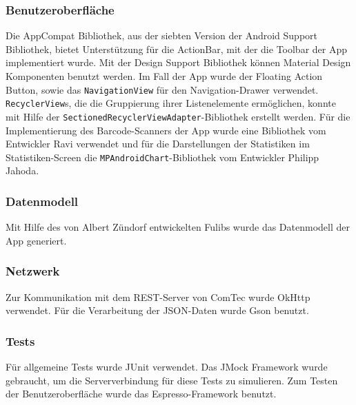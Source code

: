\subsubsection{Benutzeroberfläche} \label{subsubsec:ui-libraries}
Die AppCompat Bibliothek, aus der siebten Version der Android Support Bibliothek, bietet Unterstützung für die ActionBar, mit der die Toolbar der App implementiert wurde.
Mit der Design Support Bibliothek können Material Design Komponenten benutzt werden.
Im Fall der App wurde der Floating Action Button, sowie das \texttt{NavigationView} für den Navigation-Drawer verwendet.
\texttt{RecyclerView}s, die die Gruppierung ihrer Listenelemente ermöglichen, konnte mit Hilfe der \texttt{SectionedRecyclerViewAdapter}-Bibliothek erstellt werden.
Für die Implementierung des Barcode-Scanners der App wurde eine Bibliothek vom Entwickler Ravi verwendet und für die Darstellungen der Statistiken im Statistiken-Screen die \texttt{MPAndroidChart}-Bibliothek vom Entwickler Philipp Jahoda.

\subsubsection{Datenmodell} \label{subsubsec:model-libraries}
Mit Hilfe des von Albert Zündorf entwickelten Fulibs wurde das Datenmodell der App generiert.

\subsubsection{Netzwerk} \label{subsubsec:network-libraries}
Zur Kommunikation mit dem REST-Server von ComTec wurde OkHttp verwendet.
Für die Verarbeitung der JSON-Daten wurde Gson benutzt.

\subsubsection{Tests} \label{subsubsec:tests-libraries}
Für allgemeine Tests wurde JUnit verwendet.
Das JMock Framework wurde gebraucht, um die Serververbindung für diese Tests zu simulieren.
Zum Testen der Benutzeroberfläche wurde das Espresso-Framework benutzt.
